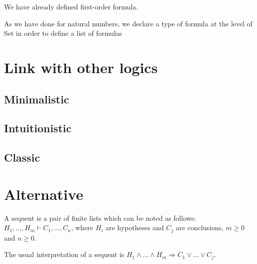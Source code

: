 \documentclass{article}
\begin{document}
		
	We have already defined first-order formula.
	
	As we have done for natural numbers, we declare a type of formula at the level of Set in order to define a list of formulas
	
	
	
	
	
	
	
	
	
	
	
	\section{Link with other logics}
	
	\subsection{Minimalistic}
	
	
	
	
	\subsection{Intuitionistic}
	
	
	
	\subsection{Classic}
	
	
	\section{Alternative}
	
	A sequent is a pair of finite lists which can be noted as follows: $H_1,...,H_m \vdash C_1,...,C_n$, where $H_i$ are hypotheses and $C_j$ are conclusions, $m \ge 0$ and $n \ge 0$.
	
	The usual interpretation of a sequent is
	$H_1 \land ... \land H_m \Rightarrow C_1 \lor ... \lor C_j$.
	
\end{document}

